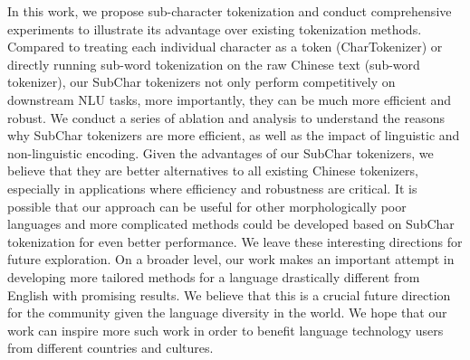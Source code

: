 In this work, we propose sub-character tokenization and conduct comprehensive experiments to illustrate its advantage over existing tokenization methods. 
%
%
Compared to treating each individual character as a token (CharTokenizer) or directly running sub-word tokenization on the raw Chinese text (sub-word tokenizer), our SubChar tokenizers not only perform competitively on downstream NLU tasks, more importantly, they can be much more efficient and robust.
%
We conduct a series of ablation and analysis to understand the reasons why SubChar tokenizers are more efficient, as well as the impact of linguistic and non-linguistic encoding.
%
Given the advantages of our SubChar tokenizers, we believe that they are better alternatives to all existing Chinese tokenizers, especially in applications where efficiency and robustness are critical. 
%
%
It is possible that our approach can be useful for other morphologically poor languages and more complicated methods could be developed based on SubChar tokenization for even better performance. We leave these interesting directions for future exploration.
%
On a broader level, our work makes an important attempt in developing more tailored methods for a language drastically different from English with promising results. We believe that this is a crucial future direction for the community given the language diversity in the world.
%
We hope that our work can inspire more such work in order to benefit language technology users from different countries and cultures.




